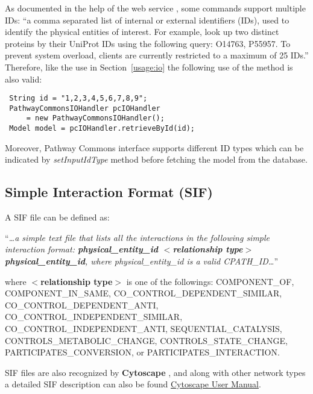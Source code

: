 \documentclass[10pt]{article}
\newenvironment{mylisting}
{\begin{list}{}{\setlength{\leftmargin}{2em}}\item\small\bfseries}
{\end{list}}
\begin{document}
As documented in the help of the web service \cite{pchelp}, some commands support multiple IDs: ``a comma separated list of internal or external identifiers (IDs), used to identify the physical entities of interest. For example, look up two distinct proteins by their UniProt IDs using the following query: O14763, P55957. To prevent system overload, clients are currently restricted to a maximum of 25 IDs.'' Therefore, like the use in Section~\ref{usage:io} the following use of the method is also valid:

\begin{mylisting}
\begin{verbatim}
 String id = "1,2,3,4,5,6,7,8,9";
 PathwayCommonsIOHandler pcIOHandler 
     = new PathwayCommonsIOHandler();
 Model model = pcIOHandler.retrieveById(id);
\end{verbatim}
\end{mylisting}

Moreover, Pathway Commons interface supports different ID types which can be indicated by \textit{setInputIdType} method before fetching the model from the database.

\subsection{Simple Interaction Format (SIF)}
\label{appendix:sif}
A SIF file can be defined as:

``\textit{\ldots a simple text file that lists all the interactions in the following simple interaction format: \textbf{physical\_entity\_id $<$relationship type$>$ physical\_entity\_id}, where physical\_entity\_id is a valid CPATH\_ID\ldots}'' \cite{pchelp}

where \textbf{$<$relationship type$>$} is one of the followings: {\small COMPONENT\_OF, COMPONENT\_IN\_SAME, CO\_CONTROL\_DEPENDENT\_SIMILAR, CO\_CONTROL\_DEPENDENT\_ANTI, CO\_CONTROL\_INDEPENDENT\_SIMILAR, CO\_CONTROL\_INDEPENDENT\_ANTI, SEQUENTIAL\_CATALYSIS, CONTROLS\_METABOLIC\_CHANGE, CONTROLS\_STATE\_CHANGE, PARTICIPATES\_CONVERSION}, or {\small PARTICIPATES\_INTERACTION}. 

SIF files are also recognized by \textbf{Cytoscape} \cite{cytoscape}, and along with other network types a detailed SIF description can also be found \href{http://www.cytoscape.org/cgi-bin/moin.cgi/Cytoscape\_User\_Manual/Network\_Formats}{Cytoscape User Manual}.


\end{document}
